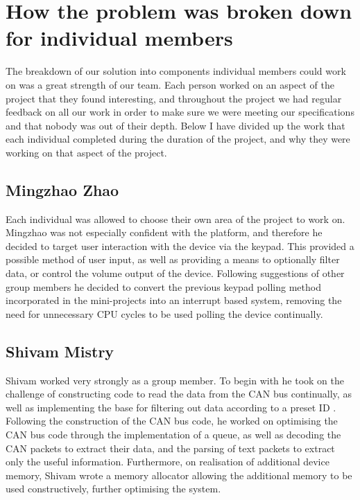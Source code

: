 \section{How the problem was broken down for individual members}

The breakdown of our solution into components individual members could work on 
was a great strength of our team. Each person worked on an aspect of the project 
that they found interesting, and throughout the project we had regular feedback 
on all our work in order to make sure we were meeting our specifications and 
that nobody was out of their depth. Below I have divided up the work that each 
individual completed during the duration of the project, and why they were 
working on that aspect of the project. 

\subsection*{Mingzhao Zhao}
Each individual was allowed to choose their own area of the project to work on. 
Mingzhao was not especially confident with the platform, and therefore he 
decided to target user interaction with the device via the keypad. This 
provided a possible method of user input, as well as providing a means to 
optionally filter data, or control the volume output of the device. 
Following suggestions 
of other group members he decided to convert the previous keypad polling method 
incorporated in the mini-projects into an interrupt based system, removing the 
need for unnecessary CPU cycles to be used polling the device continually. 

\subsection*{Shivam Mistry} 
Shivam worked very strongly as a group member. To begin with he took on the 
challenge of constructing code to read the data from the CAN bus continually, 
as well as implementing the base for filtering out data according to a preset ID
. Following the construction of the CAN bus code, he worked on optimising the 
CAN bus code through the
implementation of a queue, as well as decoding the CAN packets to extract their
data, and the parsing of text packets to extract only the useful information. 
Furthermore, on realisation of additional device memory, Shivam wrote a memory 
allocator allowing the additional memory to be used constructively, further 
optimising the system. 


